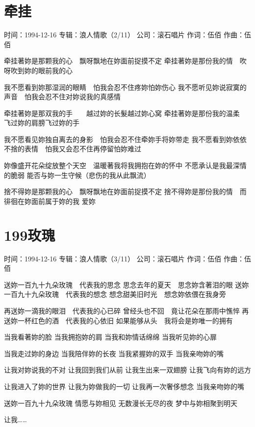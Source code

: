 \documentclass[UTF8,a4paper,oneside,twocolumn,12pt]{ctexbook}
\newcommand{\infopair}[2]{\textbullet #1：#2}
\newcommand{\zc}[1][伍佰]{\infopair{作词}{#1}}
\newcommand{\zq}[1][伍佰]{\infopair{作曲}{#1}}
\newcommand{\zj}[1]{\infopair{专辑}{#1}}
\newcommand{\sj}[1]{\infopair{时间}{#1}}
\newcommand{\gs}[1]{\infopair{公司}{#1}}
\newenvironment{info}{\begin{flushleft}\kaishu
	}
	{\end{flushleft}\normalsize\yahei\par}
\newenvironment{lyric}{
	}
{}
\begin{document}
\section{牵挂}
\begin{info}
	\sj{1994-12-16}
	\zj{浪人情歌（2/11）}
	\gs{滚石唱片}
	\zc
	\zq
\end{info}
\begin{lyric}
	牵挂著妳是那颗我的心　飘呀飘地在妳面前捉摸不定
	牵挂著妳是那份我的情　吹呀吹到妳的眼前我的心

	我不愿看到妳那湿润的眼睛　怕我会忍不住疼妳怕妳伤心
	我不愿听见妳说寂寞的声音　怕我会忍不住对妳说我的真感情

	牵挂著妳是那双我的手　　越过妳的长髮越过妳心窝
	牵挂著妳是那份我的温柔　飞过妳的肩膀飞过妳的手

	我不愿看见妳独自离去的身影　怕我会忍不住牵妳手将妳带走
	我不愿看到妳依依不捨的表情　怕我又会忍不住再停留怕妳难过

	妳像盛开花朵绽放整个天空　温暖著我将我拥抱在妳的怀中
	不愿承认是我最深情的脆弱
	能否与妳一生守候（悲伤的我从此飘流）

	捨不得妳是那颗我的心　飘呀飘地在妳面前捉摸不定
	捨不得妳是那份我的情　而徘徊在妳面前属于妳的我
	爱妳
\end{lyric}

\section{199玫瑰}
\begin{info}
	\sj{1994-12-16}
	\zj{浪人情歌（3/11）}
	\gs{滚石唱片}
	\zc
	\zq
\end{info}
\begin{lyric}
	送妳一百九十九朵玫瑰　代表我的思念
	思念去年的夏天　思念妳含著泪的眼
	送妳一百九十九朵玫瑰　代表我的想念
	想念甜美旧时光　想念妳依偎在我身旁

	再送妳一滴我的眼泪　代表我的心已碎
	曾经头也不回　竟让花朵在那雨中憔悴
	再送妳一杯红色的酒　代表我的心依旧
	如果能够从头　我将会是妳唯一的拥有

	当我看著妳的脸
	当我拥抱妳的肩
	当我和妳情话绵绵
	当我听见妳的心扉

	当我走过妳的身边
	当我陪伴妳的长夜
	当我紧握妳的双手
	当我亲吻妳的嘴

	让我对妳说我的不对
	让我回到我们从前
	让我生出来一双翅膀
	让我飞向有妳的远方

	让我进入了妳的世界
	让我为妳做我的一切
	让我再一次奢侈想念
	当我亲吻妳的嘴

	送妳一百九十九朵玫瑰
	情愿与妳相见
	无数漫长无尽的夜
	梦中与妳相聚到明天

	让我……
\end{lyric}
\end{document}
